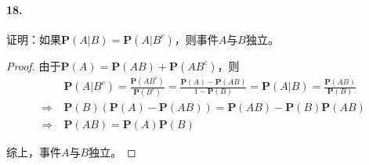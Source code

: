 \documentclass[12pt, a4paper, oneside]{ctexart}
\begin{document}
\paragraph{18.}证明：如果$\textbf{P}(A|B)=\textbf{P}(A|B^c)$，则事件$A$与$B$独立。
\begin{proof}
    由于$\textbf{P}(A) = \textbf{P}(AB)+\textbf{P}(AB^c)$，则
    \begin{equation*}
        \begin{aligned}
            &\ \textbf{P}(A|B^c) = \frac{\textbf{P}(AB^c)}{\textbf{P}(B^c)}=\frac{\textbf{P}(A)-\textbf{P}(AB)}{1-\textbf{P}(B)}=\textbf{P}(A|B) = \frac{\textbf{P}(AB)}{\textbf{P}(B)}\\
            \Rightarrow&\ \textbf{P}(B)(\textbf{P}(A)-\textbf{P}(AB)) = \textbf{P}(AB)-\textbf{P}(B)\textbf{P}(AB)\\
            \Rightarrow&\ \textbf{P}(AB) = \textbf{P}(A)\textbf{P}(B)
        \end{aligned}
    \end{equation*}

    综上，事件$A$与$B$独立。
\end{proof}
\end{document}
